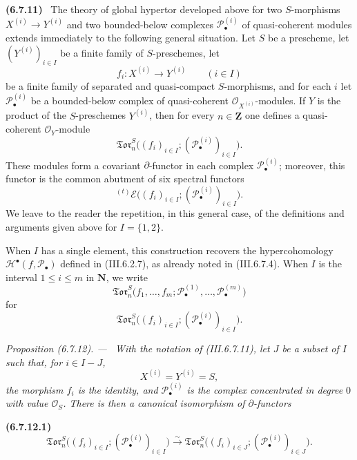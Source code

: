 \documentclass[10pt,oneside]{book}
\newcommand{\sh}[1]{\mathscr{#1}}
\newcommand{\sref}[2][]{(#2)}
\newenvironment{env}[1][]{\par\medskip\noindent\textbf{(#1)}\ }{\par}
\newenvironment{proposition}[1][]{\par\medskip\noindent\itshape Proposition (#1). ---\ }{\par}
\begin{document}
\begin{env}[6.7.11]
\label{III.6.7.11}
The theory of global hypertor developed above for two
$S$-morphisms $X^{(i)}\to Y^{(i)}$ and two bounded-below
complexes $\sh P_\bullet^{(i)}$ of quasi-coherent modules extends
immediately to the following general situation.  Let $S$ be a
prescheme, let $(Y^{(i)})_{i\in I}$ be a finite family of
$S$-preschemes, let
\[
  f_i:X^{(i)}\longrightarrow Y^{(i)}
  \qquad (i\in I)
\]
be a finite family of separated and quasi-compact
$S$-morphisms, and for each $i$ let $\sh P_\bullet^{(i)}$ be a
bounded-below complex of quasi-coherent
$\sh O_{X^{(i)}}$-modules.  If $Y$ is the product of the
$S$-preschemes $Y^{(i)}$, then for every $n\in\mathbf Z$ one
defines a quasi-coherent $\sh O_Y$-module
\[
  \mathfrak{Tor}_n^S
  \bigl(
    (f_i)_{i\in I};
    (\sh P_\bullet^{(i)})_{i\in I}
  \bigr).
\]
These modules form a covariant $\partial$-functor in each complex
$\sh P_\bullet^{(i)}$; moreover, this functor is the common
abutment of six spectral functors
\[
  {}^{(t)}\sh E
  \bigl(
    (f_i)_{i\in I};
    (\sh P_\bullet^{(i)})_{i\in I}
  \bigr).
\]
We leave to the reader the repetition, in this general case, of
the definitions and arguments given above for $I=\{1,2\}$.

When $I$ has a single element, this construction recovers the
hypercohomology $\sh H^\bullet(f,\sh P_\bullet)$ defined in
\sref{III.6.2.7}, as already noted in \sref{III.6.7.4}.  When
$I$ is the interval $1\leq i\leq m$ in $\mathbf N$, we write
\label{III.6.7.11.2}
\[
  \mathfrak{Tor}_n^S
  \bigl(
    f_1,\ldots,f_m;
    \sh P_\bullet^{(1)},\ldots,\sh P_\bullet^{(m)}
  \bigr)
\]
for
\[
  \mathfrak{Tor}_n^S
  \bigl(
    (f_i)_{i\in I};
    (\sh P_\bullet^{(i)})_{i\in I}
  \bigr).
\]
\end{env}

\begin{proposition}[6.7.12]
\label{III.6.7.12}
With the notation of \sref{III.6.7.11}, let $J$ be a subset of
$I$ such that, for $i\in I-J$,
\[
  X^{(i)}=Y^{(i)}=S,
\]
the morphism $f_i$ is the identity, and
$\sh P_\bullet^{(i)}$ is the complex concentrated in degree $0$
with value $\sh O_S$.  There is then a canonical isomorphism of
$\partial$-functors
\begin{env}[6.7.12.1]
\label{III.6.7.12.1}
\[
  \mathfrak{Tor}_n^S
  \bigl(
    (f_i)_{i\in I};
    (\sh P_\bullet^{(i)})_{i\in I}
  \bigr)
  \xrightarrow{\sim}
  \mathfrak{Tor}_n^S
  \bigl(
    (f_i)_{i\in J};
    (\sh P_\bullet^{(i)})_{i\in J}
  \bigr).
  \tag{6.7.12.1}\label{III.6.7.12.1.eq}
\]
\end{env}
\end{proposition}
\end{document}
